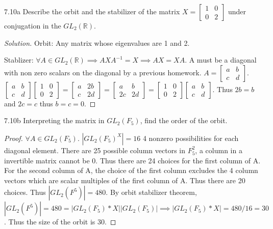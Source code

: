 \documentclass{article}
\newcommand{\R}{\mathbb{R}}
\newenvironment{solution}
{\renewcommand\qedsymbol{$\blacksquare$}\begin{proof}[Solution]}
{\end{proof}}
\begin{document}
\begin{PROB}{7.10a}\label{Problem 7.10a.}
Describe the orbit and the stabilizer of the matrix $X = \begin{bmatrix}
    1 & 0 \\ 0 & 2
\end{bmatrix}$ under conjugation in the $GL_2(\R)$.
\end{PROB}
\begin{solution}
    Orbit: Any matrix whose eigenvalues are 1 and 2.

    Stablizer: $\forall A \in GL_2(\R) \implies AXA^{-1} = X \implies AX = XA$. A must be a diagonal with non zero scalars on the diagonal by a previous homework. $A = \begin{bmatrix}
        a & b \\ c & d
    \end{bmatrix}$. $\begin{bmatrix}
        a & b \\ c & d
    \end{bmatrix}\begin{bmatrix}
        1 & 0 \\ 0 & 2
    \end{bmatrix} = \begin{bmatrix}
        a & 2b \\ c & 2d
    \end{bmatrix} = \begin{bmatrix}
        a & b \\ 2c & 2d
    \end{bmatrix} = \begin{bmatrix}
        1 & 0 \\ 0 & 2
    \end{bmatrix}\begin{bmatrix}
        a & b \\ c & d
    \end{bmatrix}$. Thus $2b = b$ and $2c = c$ thus $b = c = 0$.
\end{solution}

\begin{PROB}{7.10b}\label{Problem 7.10b.}
    Interpreting the matrix in $GL_2(F_5)$, find the order of the orbit.
\end{PROB}
\begin{proof}
    $\forall A \in GL_2(F_5)$. $|GL_2(F_5)^X| = 16$ 4 nonzero possibilities for each diagonal element. There are 25 possible column vectors in $F_5^2$, a column in a invertible matrix cannot be 0. Thus there are 24 choices for the first column of A. For the second column of A, the choice of the first column excludes the 4 column vectors which are scalar multiples of the first column of A. Thus there are 20 choices. Thus $|GL_2(F^5)| = 480$. By orbit stabilizer theorem, $|GL_2(F^5)| = 480 = |GL_2(F_5) * X||GL_2(F_5)| \implies |GL_2(F_5) * X| = 480 / 16 = 30$. Thus the size of the orbit is 30.
\end{proof}
\end{document}
